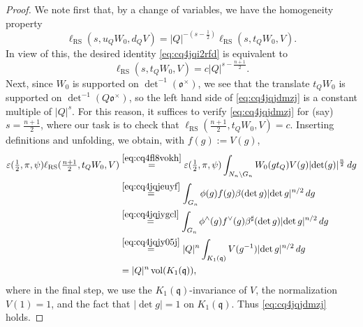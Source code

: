 \documentclass[reqno]{amsart}
\theoremstyle{plain}
\theoremstyle{definition}
\begin{document}
\begin{proof}
  We note first that, by a change of variables, we have the homogeneity property
  \begin{equation}\label{eq:cq4jqpwhnv}
    \ell_{\mathrm{RS}}(s, u_{Q} W_0, d_{Q}V) = \lvert Q \rvert^{- \left( s - \frac{1}{2} \right)} \ell_{\mathrm{RS}}(s, t_{Q} W_0, V).
  \end{equation}
  In view of this, the desired identity \eqref{eq:cq4jqi2rfd} is equivalent to
  \begin{equation}\label{eq:cq4jqjdmzj}
    \ell_{\mathrm{RS}}(s, t_{Q} W_0, V) = c \lvert Q \rvert^{s - \frac{n+1}{2}}.
  \end{equation}
  Next, since $W_0$ is supported on $\det^{-1}(\mathfrak{o}^\times)$, we see that the translate $t_{Q} W_0$ is supported on $\det^{-1}(Q \mathfrak{o}^\times)$, so the left hand side of \eqref{eq:cq4jqjdmzj} is a constant multiple of $\lvert Q \rvert^s$.  For this reason, it suffices to verify \eqref{eq:cq4jqjdmzj} for (say) $s = \tfrac{n+1}{2}$, where our task is to check that $\ell_{\mathrm{RS}}(\tfrac{n+1}{2}, t_{Q} W_0, V) = c$.
  Inserting definitions and unfolding, we obtain, with $f(g) := V(g)$,
  \begin{align*}
    \varepsilon(\tfrac{1}{2}, \pi, \psi) \ell_{\mathrm{RS}}(\tfrac{n+1}{2}, t_{Q} W_0, V)
    &\overset{\eqref{eq:cq4fl8vokh}}{=}
      \varepsilon(\tfrac{1}{2}, \pi, \psi)
      \int_{N_n \backslash G_n} W_0(g t_Q) V (g) \lvert \det (g) \rvert^{\frac{n}{2}} \, d g
    \\
    &\overset{\eqref{eq:cq4jqjeuyf}}{=}
      \int_{G_n}
      \phi(g)
      f(g)
      \beta(\det g)
      \lvert \det g \rvert^{n/2}
      \, d g \\
    &\overset{\eqref{eq:cq4jqjygcl}}{=}
      \int_{G_n}
      \phi^\wedge(g)
      f^\vee(g)
      \beta^\sharp(\det g) \lvert \det g \rvert^{n/2} \, d g \\
    &\overset{\eqref{eq:cq4jqjy05j}}{=}
      \lvert Q \rvert^n \int_{K_1(\mathfrak{q})} V(g^{-1}) \lvert \det g \rvert^{n/2} \, d g \\
    &= \lvert Q \rvert^n \operatorname{vol}(K_1(\mathfrak{q})),
  \end{align*}
  where in the final step, we use the $K_1(\mathfrak{q})$-invariance of $V$, the normalization $V(1) = 1$, and the fact that $\lvert \det g \rvert = 1$ on $K_1(\mathfrak{q})$.  Thus \eqref{eq:cq4jqjdmzj} holds.
\end{proof}

\end{document}
